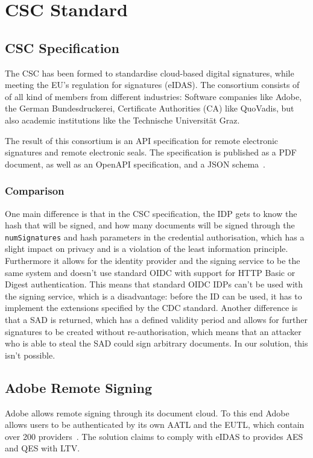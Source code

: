 \chapter{\gls{CSC} Standard}\label{ch:glsstandard}

\section{CSC Specification}\label{sec:csc-specification}

The \gls{CSC} has been formed to standardise cloud-based digital signatures, while meeting the \gls{EU}'s regulation for signatures (\gls{eIDAS}).
The consortium consists of of all kind of members from different industries: Software companies like Adobe,
the German Bundesdruckerei, Certificate Authorities (\gls{CA}) like QuoVadis,
but also academic institutions like the Technische Universit\"at Graz.

The result of this consortium is an \gls{API} specification for remote electronic signatures and remote electronic seals.
The specification is published as a \gls{PDF} document, as well as an \gls{OpenAPI} specification, and a \gls{JSON} schema~\cite{csc-spec}.

\subsection{Comparison}\label{subsec:comparison}
One main difference is that in the \gls{CSC} specification,
the \gls{IDP} gets to know the hash that will be signed,
and how many documents will be signed through the \texttt{numSignatures} and hash parameters in the credential authorisation,
which has a slight impact on privacy and is a violation of the least information principle.
Furthermore it allows for the identity provider and the signing service to be the same system and doesn't use standard \gls{OIDC} with support for \gls{HTTP} Basic or Digest authentication.
This means that standard \gls{OIDC} \gls{IDP}s can't be used with the signing service, which is a disadvantage: before the \gls{ID} can be used, it has to implement the extensions specified by the \gls{CDC} standard.
Another difference is that a \gls{SAD} is returned, which has a defined validity period and allows for further signatures to be created without re-authorisation,
which means that an attacker who is able to steal the \gls{SAD} could sign arbitrary documents.
In our solution, this isn't possible.

\section{Adobe Remote Signing}\label{sec:adobe-remote-signing}
Adobe allows remote signing through its document cloud.
To this end Adobe allows users to be authenticated by its own \gls{AATL} and the \gls{EUTL}, which contain over 200 providers~\cite{adobe-cloud-sign}.
The solution claims to comply with \gls{eIDAS} to provides \gls{AES} and \gls{QES} with \gls{LTV}.
